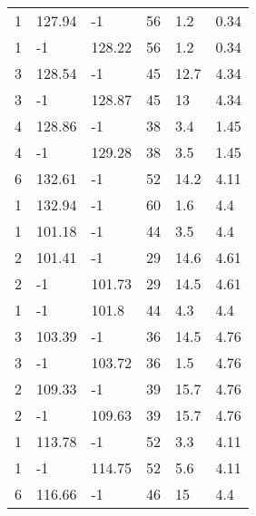 \begin{table*}[h!]
\begin{tabular*}{\linewidth}{p{50pt}<{\centering}p{50pt}<{\centering}
    p{60pt}<{\centering}p{60pt}<{\centering}p{60pt}<{\centering}p{70pt}<{\centering}}
    1 & 127.94 & -1 & 56 & 1.2 & 0.34 \\
    1 & -1 & 128.22 & 56 & 1.2 & 0.34 \\
    3 & 128.54 & -1 & 45 & 12.7 & 4.34 \\
    3 & -1 & 128.87 & 45 & 13 & 4.34 \\
    4 & 128.86 & -1 & 38 & 3.4 & 1.45 \\
    4 & -1 & 129.28 & 38 & 3.5 & 1.45 \\
    6 & 132.61 & -1 & 52 & 14.2 & 4.11 \\
    1 & 132.94 & -1 & 60 & 1.6 & 4.4 \\
    1 & 101.18 & -1 & 44 & 3.5 & 4.4 \\
    2 & 101.41 & -1 & 29 & 14.6 & 4.61 \\
    2 & -1 & 101.73 & 29 & 14.5 & 4.61 \\
    1 & -1 & 101.8 & 44 & 4.3 & 4.4 \\
    3 & 103.39 & -1 & 36 & 14.5 & 4.76 \\
    3 & -1 & 103.72 & 36 & 1.5 & 4.76 \\
    2 & 109.33 & -1 & 39 & 15.7 & 4.76 \\
    2 & -1 & 109.63 & 39 & 15.7 & 4.76 \\
    1 & 113.78 & -1 & 52 & 3.3 & 4.11 \\
    1 & -1 & 114.75 & 52 & 5.6 & 4.11 \\
    6 & 116.66 & -1 & 46 & 15 & 4.4 \\
    \bottomrule
  \end{tabular*}
  \label{Ap4}
\end{table*}



